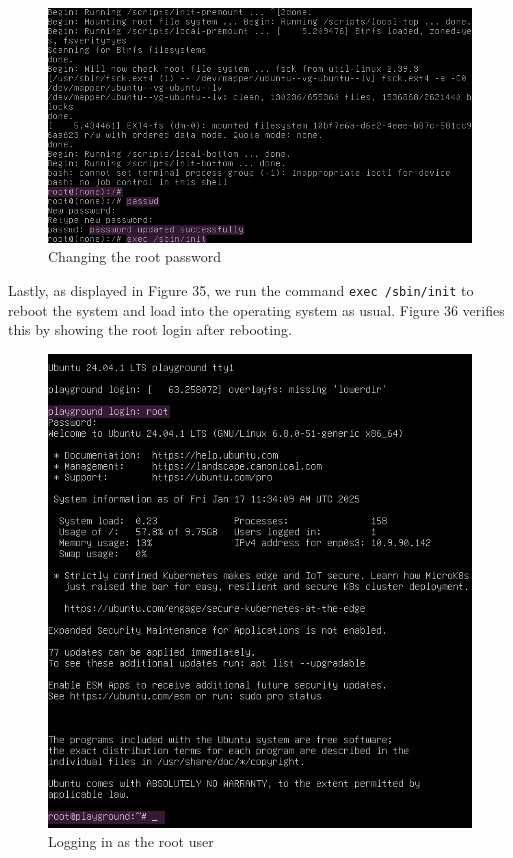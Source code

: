 \documentclass[a4paper]{article}
\newcommand{\abc}{\hfill \break}
\begin{document}
\begin{figure}[h]
	\includegraphics[scale=0.45]{images/pwc.png}
	\centering
	\caption{Changing the root password}
\end{figure}\abc
Lastly, as displayed in Figure 35, we run the command \texttt{exec /sbin/init} to reboot the system and load into the operating system as usual.
Figure 36 verifies this by showing the root login after rebooting.\newpage
\begin{figure}[h]
	\includegraphics[scale=0.45]{images/ve.png}
	\centering
	\caption{Logging in as the root user}
\end{figure}\abc
\end{document}
